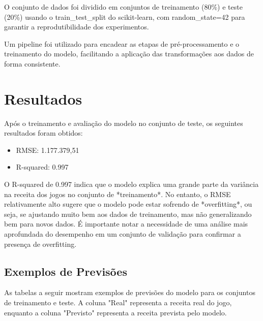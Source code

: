 \documentclass[12pt]{article}
\begin{document}
O conjunto de dados foi dividido em conjuntos de treinamento (80\%) e teste (20\%) usando o train\_test\_split do scikit-learn, com random\_state=42 para garantir a reprodutibilidade dos experimentos.

Um pipeline foi utilizado para encadear as etapas de pré-processamento e o treinamento do modelo, facilitando a aplicação das transformações aos dados de forma consistente.

\section{Resultados}
Após o treinamento e avaliação do modelo no conjunto de teste, os seguintes resultados foram obtidos:

\begin{itemize}
\item RMSE: 1.177.379,51
\item R-squared: 0.997
\end{itemize}

O R-squared de 0.997 indica que o modelo explica uma grande parte da variância na receita dos jogos no conjunto de *treinamento*. No entanto, o RMSE relativamente alto sugere que o modelo pode estar sofrendo de *overfitting*, ou seja, se ajustando muito bem aos dados de treinamento, mas não generalizando bem para novos dados.  É importante notar a necessidade de uma análise mais aprofundada do desempenho em um conjunto de validação para confirmar a presença de overfitting.

\subsection{Exemplos de Previsões}

As tabelas a seguir mostram exemplos de previsões do modelo para os conjuntos de treinamento e teste.  A coluna "Real" representa a receita real do jogo, enquanto a coluna "Previsto" representa a receita prevista pelo modelo.
\end{document}

